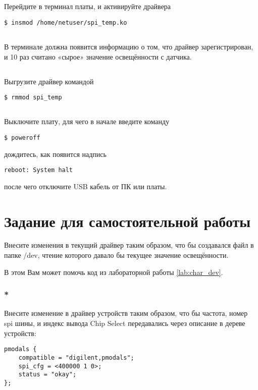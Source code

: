 \subsection{}Перейдите в терминал платы, и активируйте драйвера
\begin{lstlisting}[style=bash]
$ insmod /home/netuser/spi_temp.ko 
\end{lstlisting}

\subsection{}В терминале должна появится информацию о том, что драйвер зарегистрирован, и 10 раз считано «сырое» значение освещённости с датчика.

\subsection{}Выгрузите драйвер командой
\begin{lstlisting}[style=bash]
$ rmmod spi_temp
\end{lstlisting}

\subsection{} Выключите плату, для чего в начале введите команду
\begin{lstlisting}[style=bash]
	$ poweroff
\end{lstlisting}
дождитесь, как появится надпись
\begin{lstlisting}[style=stdout]
	reboot: System halt
\end{lstlisting}
после чего отключите USB кабель от ПК или платы. 

\section{Задание для самостоятельной работы}
Внесите изменения в текущий драйвер таким образом, что бы создавался файл в папке /dev, чтение которого давало бы текущее значение освещённости.

В этом Вам может помочь код из лабораторной работы \ref{lab:char_dev}.

\subsubsection{*}
Внесите изменение в драйвер устройств таким образом, что бы частота, номер spi шины, и индекс вывода Chip Select передавались через описание в дереве устройств:
\begin{lstlisting}[style=stdout]
pmodals {
	compatible = "digilent,pmodals";
	spi_cfg = <400000 1 0>;	  
	status = "okay";
};
\end{lstlisting}
